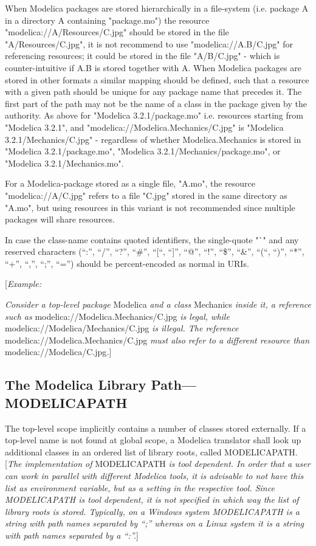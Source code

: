\documentclass[../MLS.tex]{subfiles}
\begin{document}
When Modelica packages are stored hierarchically in a file-system (i.e.
package A in a directory A containing "package.mo") the resource
"modelica://A/Resources/C.jpg" should be stored in the file
"A/Resources/C.jpg", it is not recommend to use "modelica://A.B/C.jpg"
for referencing resources; it could be stored in the file "A/B/C.jpg" -
which is counter-intuitive if A.B is stored together with A. When
Modelica packages are stored in other formats a similar mapping should
be defined, such that a resource with a given path should be unique for
any package name that precedes it. The first part of the path may not be
the name of a class in the package given by the authority. As above for
"Modelica 3.2.1/package.mo" i.e. resources starting from "Modelica
3.2.1", and "modelica://Modelica.Mechanics/C.jpg" is "Modelica
3.2.1/Mechanics/C.jpg" - regardless of whether Modelica.Mechanics is
stored in "Modelica 3.2.1/package.mo", "Modelica
3.2.1/Mechanics/package.mo", or "Modelica 3.2.1/Mechanics.mo".

For a Modelica-package stored as a single file, "A.mo", the resource
"modelica://A/C.jpg" refers to a file "C.jpg" stored in the same
directory as "A.mo", but using resources in this variant is not
recommended since multiple packages will share resources.

In case the class-name contains quoted identifiers, the single-quote "`"
and any reserved characters (``:'', ``/'', ``?'', ``\#'', ``{[}``,
``{]}'', ``@'', ``!'', ``\$'', ``\&'', ``(``, ``)'', ``*'', ``+'',
``,'', ``;'', ``='') should be percent-encoded as normal in URIs.

{[}\emph{Example:}

\emph{Consider a top-level package} Modelica \emph{and a class}
Mechanics \emph{inside it, a reference such as}
modelica://Modelica.Mechanics/C.jpg \emph{is legal, while}
modelica://Modelica/Mechanics/C.jpg \emph{is illegal. The reference}
modelica://Modelica.Mechanics/C.jpg \emph{must also refer to a different
resource than} modelica://Modelica/C.jpg\emph{.}{]}

\subsection{The Modelica Library Path---MODELICAPATH}

The top-level scope implicitly contains a number of classes stored
externally. If a top-level name is not found at global scope, a Modelica
translator shall look up additional classes in an ordered list of
library roots, called MODELICAPATH. {[}\emph{The implementation of}
MODELICAPATH \emph{is tool dependent. In order that a user can work in
parallel with different Modelica tools, it is advisable to not have this
list as environment variable, but as a setting in the respective tool.
Since MODELICAPATH is tool dependent, it is not specified in which way
the list of library roots is stored. Typically, on a Windows system
MODELICAPATH is a string with path names separated by ``;'' whereas on a
Linux system it is a string with path names separated by a ``:''.}{]}
\end{document}
